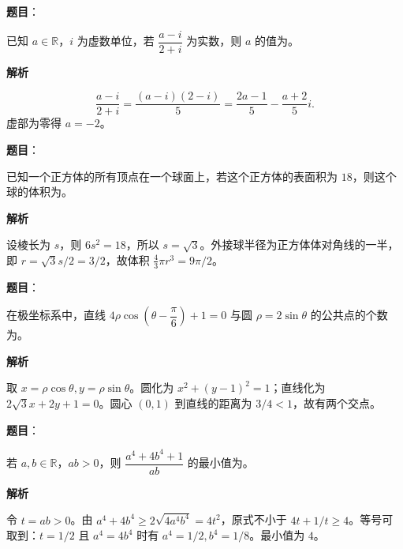 \begin{answer}

\textbf{题目}：

已知 $a\in\mathbb R$，$i$ 为虚数单位，若 $\dfrac{a-i}{2+i}$ 为实数，则 $a$ 的值为\gkblank{}。

\textbf{解析}

\nopagebreak[4]
\[
\frac{a-i}{2+i}=\frac{(a-i)(2-i)}5=\frac{2a-1}{5}-\frac{a+2}{5}i.
\]
虚部为零得 $a=-2$。


\end{answer}
\begin{answer}

\textbf{题目}：

已知一个正方体的所有顶点在一个球面上，若这个正方体的表面积为 $18$，则这个球的体积为\gkblank{}。

\textbf{解析}

设棱长为 $s$，则 $6s^2=18$，所以 $s=\sqrt3$。外接球半径为正方体体对角线的一半，即 $r=\sqrt3s/2=3/2$，故体积 $\frac43\pi r^3=9\pi/2$。


\end{answer}
\begin{answer}

\textbf{题目}：

在极坐标系中，直线 $4\rho\cos\left(\theta-\dfrac\pi6\right)+1=0$ 与圆 $\rho=2\sin\theta$ 的公共点的个数为\gkblank{}。

\textbf{解析}

取 $x=\rho\cos\theta,y=\rho\sin\theta$。圆化为 $x^2+(y-1)^2=1$；直线化为 $2\sqrt3x+2y+1=0$。圆心 $(0,1)$ 到直线的距离为 $3/4<1$，故有两个交点。


\end{answer}
\begin{answer}

\textbf{题目}：

若 $a,b\in\mathbb R$，$ab>0$，则 $\dfrac{a^4+4b^4+1}{ab}$ 的最小值为\gkblank{}。

\textbf{解析}

令 $t=ab>0$。由 $a^4+4b^4\geqslant2\sqrt{4a^4b^4}=4t^2$，原式不小于 $4t+1/t\geqslant4$。等号可取到：$t=1/2$ 且 $a^4=4b^4$ 时有 $a^4=1/2,b^4=1/8$。最小值为 $4$。


\end{answer}
